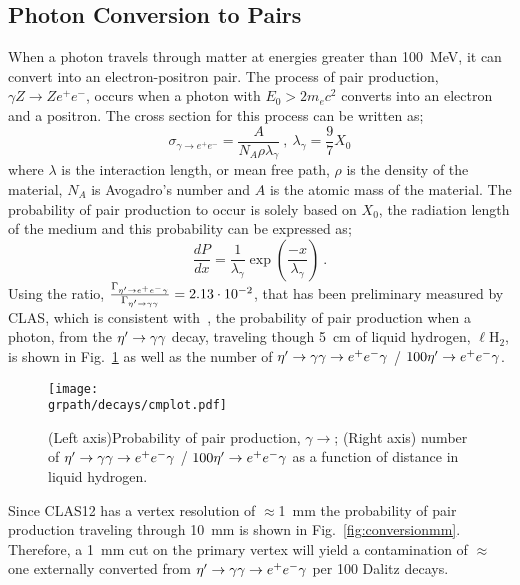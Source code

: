 \subsection{Photon Conversion to \epemT Pairs}\label{sec:intro.conversion}
When a photon travels through matter at energies greater than 100~MeV, it can convert into an electron-positron pair. The process of pair production, $\gamma Z \rightarrow Ze^{+}e^{-}$, occurs when a photon with $E_0 > 2 m_e c^2$ converts into an electron and a positron. The cross section for this process can be written as;
\begin{equation}\label{pair_crosssection}
\sigma_{\gamma\rightarrow e^+e^-} =  \frac{A}{N_{A} \rho \lambda_\gamma}  \ ,\ \lambda_\gamma = \frac{9}{7}X_0
\end{equation}
where $\lambda$ is the interaction length, or mean free path, $\rho$ is the density of the material, $N_A$ is Avogadro's number and $A$ is the atomic mass of the material. The probability of pair production to occur is solely based on $X_{0}$, the radiation length of the medium and this probability can be expressed as;
\begin{equation}
\frac{dP}{dx} = \frac{1}{\lambda_\gamma}\exp(\frac{-x}{\lambda_\gamma}) \ .
\end{equation}
%
%
Using the ratio, $\frac{\Gamma_{\eta^{\prime} \to e^+e^- \gamma}}{\Gamma_{\eta^{\prime} \to \gamma \gamma}} = 2.13\cdot 10^{-2}$, that has been preliminary measured by CLAS, which is consistent with~\cite{BESIII}, the probability of pair production when a photon, from the $\eta^{\prime} \to \gamma \gamma$ decay, traveling though 5~cm of liquid hydrogen, $\ell$H$_2$, is shown in Fig.~\ref{fig:conversion} as well as the number of $\eta^{\prime} \to \gamma \gamma \rightarrow e^+e^- \gamma$ / $100 \eta^{\prime} \rightarrow e^+e^- \gamma$. 
\begin{figure}[h!]\begin{center}
	\texttt{[image: \\grpath/decays/cmplot.pdf]}
	\caption[Probability of pair production, $\gamma \to$\epemT, as a function of distance in liquid hydrogen]{\label{fig:conversion}{(Left axis)Probability of pair production, $\gamma \to$\epemT; (Right axis) number of $\eta^{\prime} \to \gamma \gamma \rightarrow e^+e^- \gamma$ / $100 \eta^{\prime} \rightarrow e^+e^- \gamma$ as a function of distance in liquid hydrogen.}}
\end{center}\end{figure}
	Since CLAS12 has a vertex resolution of $\approx$1~mm the probability of pair production traveling through 10~mm is shown in Fig.~\ref{fig:conversionmm}. Therefore, a 1~mm cut on the primary vertex will yield a contamination of $\approx$ one externally converted \epemT from $\eta^{\prime} \to \gamma \gamma \rightarrow e^+e^- \gamma$ per 100 Dalitz decays.
